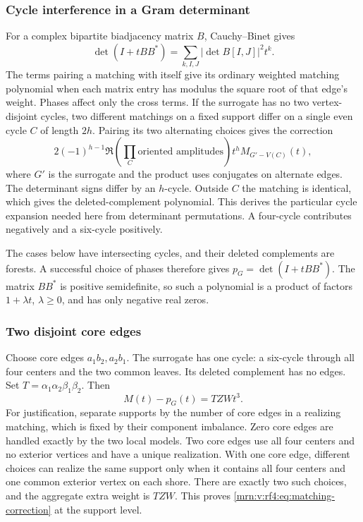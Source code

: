 \documentclass[11pt,a4paper]{article}
\theoremstyle{remark}\newtheorem{remark}[theorem]{Remark}
\begin{document}
\subsubsection{Cycle interference in a Gram determinant}
For a complex bipartite biadjacency matrix $B$, Cauchy--Binet gives
\[
\det(I+tBB^*)=\sum_{k,I,J}|\det B[I,J]|^2t^k.
\]
The terms pairing a matching with itself give its ordinary weighted matching polynomial when each matrix entry has modulus the square root of that edge's weight. Phases affect only the cross terms. If the surrogate has no two vertex-disjoint cycles, two different matchings on a fixed support differ on a single even cycle $C$ of length $2h$. Pairing its two alternating choices gives the correction
\begin{equation}\label{mrn:v:rf4:eq:cycle}
2(-1)^{h-1}\Re\left(\prod_C\text{oriented amplitudes}\right)
 t^h M_{G'-V(C)}(t),
\end{equation}
where $G'$ is the surrogate and the product uses conjugates on alternate edges. The determinant signs differ by an $h$-cycle. Outside $C$ the matching is identical, which gives the deleted-complement polynomial. This derives the particular cycle expansion needed here from determinant permutations. A four-cycle contributes negatively and a six-cycle positively.

The cases below have intersecting cycles, and their deleted complements are forests. A successful choice of phases therefore gives $p_G=\det(I+tBB^*)$. The matrix $BB^*$ is positive semidefinite, so such a polynomial is a product of factors $1+\lambda t$, $\lambda\ge0$, and has only negative real zeros.

\subsubsection{Two disjoint core edges}
Choose core edges $a_1b_2,a_2b_1$. The surrogate has one cycle: a six-cycle through all four centers and the two common leaves. Its deleted complement has no edges. Set $T=\alpha_1\alpha_2\beta_1\beta_2$. Then
\begin{equation}\label{mrn:v:rf4:eq:matching-correction}
M(t)-p_G(t)=TZWt^3.
\end{equation}
For justification, separate supports by the number of core edges in a realizing matching, which is fixed by their component imbalance. Zero core edges are handled exactly by the two local models. Two core edges use all four centers and no exterior vertices and have a unique realization. With one core edge, different choices can realize the same support only when it contains all four centers and one common exterior vertex on each shore. There are exactly two such choices, and the aggregate extra weight is $TZW$. This proves \eqref{mrn:v:rf4:eq:matching-correction} at the support level.
\end{document}
